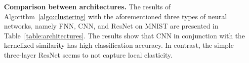 {\bf Comparison between architectures.} The results of Algorithm~\ref{algo:clustering} with the aforementioned three types of neural networks, namely FNN, CNN, and ResNet on MNIST are presented in Table~\ref{table:architectures}. The results show that CNN in conjunction with the kernelized similarity has high classification accuracy. In contrast, the simple three-layer ResNet seems to not capture local elasticity. 

